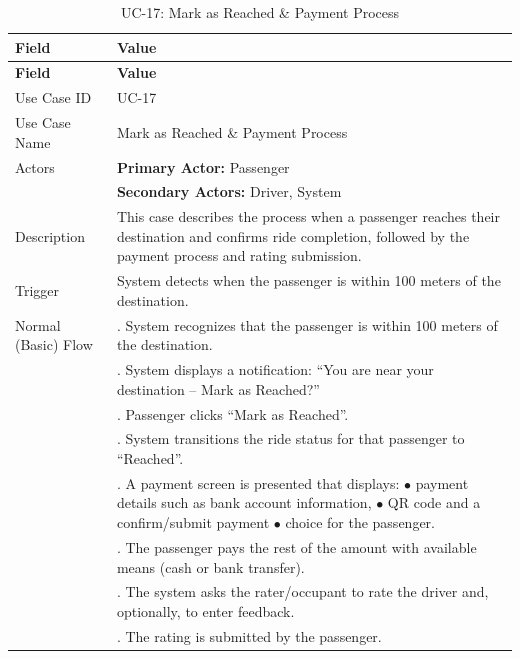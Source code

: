 \begin{longtable}{|>{\raggedright\arraybackslash}p{4cm}|>{\raggedright\arraybackslash}p{11cm}|}
\caption{UC-17: Mark as Reached \& Payment Process}
\label{tab:uc-17} \\
\hline
\rowcolor{lightgray!30}
\textbf{Field} & \textbf{Value} \\
\hline
\endfirsthead
\hline
\rowcolor{lightgray!30}
\textbf{Field} & \textbf{Value} \\
\hline
\endhead
\hline
\endfoot
\hline
\endlastfoot
Use Case ID & UC-17 \\
\hline
Use Case Name & Mark as Reached \& Payment Process \\
\hline
Actors & \textbf{Primary Actor:} Passenger \\
& \textbf{Secondary Actors:} Driver, System \\
\hline
Description & This case describes the process when a passenger reaches their destination and confirms ride completion, followed by the payment process and rating submission. \\
\hline
Trigger & System detects when the passenger is within 100 meters of the destination. \\
\hline
Normal (Basic) Flow & 1. System recognizes that the passenger is within 100 meters of the destination. \\
& 2. System displays a notification: ``You are near your destination – Mark as Reached?'' \\
& 3. Passenger clicks ``Mark as Reached''. \\
& 4. System transitions the ride status for that passenger to ``Reached''. \\
& 5. A payment screen is presented that displays: \newline $\bullet$ payment details such as bank account information, \newline $\bullet$ QR code and a confirm/submit payment \newline $\bullet$ choice for the passenger. \\
& 6. The passenger pays the rest of the amount with available means (cash or bank transfer). \\
& 7. The system asks the rater/occupant to rate the driver and, optionally, to enter feedback. \\
& 8. The rating is submitted by the passenger. \\

\end{longtable}
